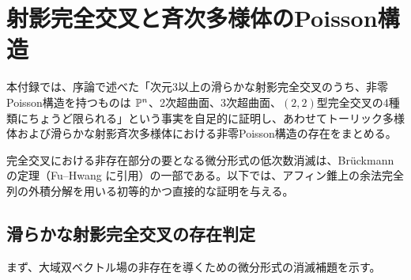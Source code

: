 \section{射影完全交叉と斉次多様体のPoisson構造}
\label{sec:general-poisson-existence}

本付録では、序論で述べた「次元3以上の滑らかな射影完全交叉のうち、非零Poisson構造を持つものは $\mathbb P^n$、2次超曲面、3次超曲面、$(2,2)$型完全交叉の4種類にちょうど限られる」という事実を自足的に証明し、あわせてトーリック多様体および滑らかな射影斉次多様体における非零Poisson構造の存在をまとめる。

完全交叉における非存在部分の要となる微分形式の低次数消滅は、Br\"uckmannの定理（Fu--Hwang \cite[Lemma~4.1]{FuHwangCI} に引用）の一部である。以下では、アフィン錐上の余法完全列の外積分解を用いる初等的かつ直接的な証明を与える。

\subsection{滑らかな射影完全交叉の存在判定}
まず、大域双ベクトル場の非存在を導くための微分形式の消滅補題を示す。

